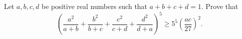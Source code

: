 Let $a,b,c,d$ be positive real numbers such that $a+b+c+d=1$. Prove that 
$$\left( \frac{a^2}{a+b}+\frac{b^2}{b+c}+\frac{c^2}{c+d}+\frac{d^2}{d+a}\right)^5
\geq 5^5\left(\frac{ac}{27}\right)^2.$$
